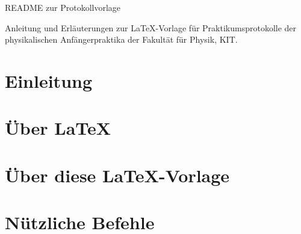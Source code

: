 \documentclass{include/protokollclass}
\begin{document}
	\frontmatter \pagestyle{empty}
	\begin{titlepage}
		\centering\Huge
		
		\vphantom{}
		
		\vspace{100px}
		
		README zur Protokollvorlage
		
		\vspace{50px}
		
		\large Anleitung und Erläuterungen zur LaTeX-Vorlage für Praktikumsprotokolle der physikalischen Anfängerpraktika der Fakultät für Physik, KIT.
	\end{titlepage}
	\clearpage
	
	\tableofcontents\thispagestyle{empty}
	
	
	
	\MainMatter
	
	\chapter{Einleitung}
	
	\chapter{Über LaTeX}
	
	\chapter{Über diese LaTeX-Vorlage}
	
	\chapter{Nützliche Befehle}
	
	
	
	
	
	\TheBibliography
	
	
	
	
\end{document}
